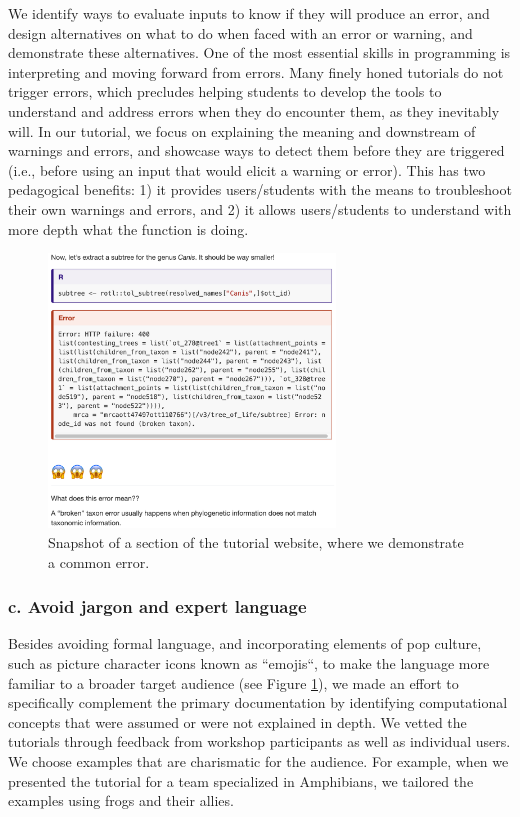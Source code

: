 \documentclass[12pt]{article}
\begin{document}
We identify ways to evaluate inputs to know if they will produce an error, and design
alternatives on what to do when faced with an error or warning, and demonstrate
these alternatives.
One of the most essential skills in programming is interpreting and moving forward
from errors.
Many finely honed tutorials do not trigger errors, which precludes helping students
to develop the tools to understand and address errors when they do encounter them,
as they inevitably will.
In our tutorial, we focus on explaining the meaning and downstream of warnings and errors, and
 showcase ways to detect them before they are triggered (i.e., before using an input
  that would elicit a warning or error). This has two pedagogical benefits:
1) it provides users/students with the means to troubleshoot their own warnings and errors, and
2) it allows users/students to understand with more depth what the function is doing.


\begin{figure}
\begin{center}
\includegraphics[width=3in]{fig1.png}
\end{center}
\caption{Snapshot of a section of the tutorial website, where we demonstrate a common error. \label{fig:first}}
\end{figure}

\subsubsection*{c. Avoid jargon and expert language}

Besides avoiding formal language, and incorporating elements of pop culture, such as picture
character icons known as ``emojis``, to make the language more familiar to a
broader target audience (see Figure \ref{fig:first}), we made an effort to specifically
complement the primary documentation by identifying
computational concepts that were assumed or were not explained in depth.
We vetted the tutorials through feedback from workshop participants as well as individual users.
We choose examples that are charismatic for the audience.
For example, when we presented the tutorial for a team specialized in Amphibians,
we tailored the examples using frogs and their allies.
\end{document}
